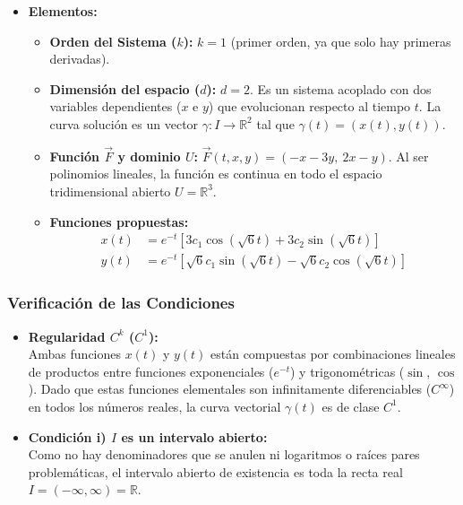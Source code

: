 \begin{enumerate}[label=\arabic*., leftmargin=*]
\begin{itemize}[leftmargin=*]
        \item \textbf{Elementos:}
        \begin{itemize}[leftmargin=*]
            \item \textbf{Orden del Sistema ($k$):} $k = 1$ (primer orden, ya que solo hay primeras derivadas).
            \item \textbf{Dimensión del espacio ($d$):} $d = 2$. Es un sistema acoplado con dos variables dependientes ($x$ e $y$) que evolucionan respecto al tiempo $t$. La curva solución es un vector $\gamma: I \to \mathbb{R}^2$ tal que $\gamma(t) = (x(t), y(t))$.
            \item \textbf{Función $\vec{F}$ y dominio $U$:} $\vec{F}(t, x, y) = (-x - 3y, \ 2x - y)$. Al ser polinomios lineales, la función es continua en todo el espacio tridimensional abierto $U = \mathbb{R}^3$.
            \item \textbf{Funciones propuestas:}
            \begin{align*}
                x(t) &= e^{-t}[3c_1\cos(\sqrt{6}t) + 3c_2\sin(\sqrt{6}t)] \\
                y(t) &= e^{-t}[\sqrt{6}c_1\sin(\sqrt{6}t) - \sqrt{6}c_2\cos(\sqrt{6}t)]
            \end{align*}
        \end{itemize}
    \end{itemize}

    \subsubsection*{Verificación de las Condiciones}

    \begin{itemize}[leftmargin=*]
        \item \textbf{Regularidad $C^k$ ($C^1$):}\\
        Ambas funciones $x(t)$ y $y(t)$ están compuestas por combinaciones lineales de productos entre funciones exponenciales ($e^{-t}$) y trigonométricas ($\sin$, $\cos$). Dado que estas funciones elementales son infinitamente diferenciables ($C^\infty$) en todos los números reales, la curva vectorial $\gamma(t)$ es de clase $C^1$.

        \item \textbf{Condición i) $I$ es un intervalo abierto:}\\
        Como no hay denominadores que se anulen ni logaritmos o raíces pares problemáticas, el intervalo abierto de existencia es toda la recta real $I = (-\infty, \infty) = \mathbb{R}$.


\end{itemize}
\end{enumerate}
